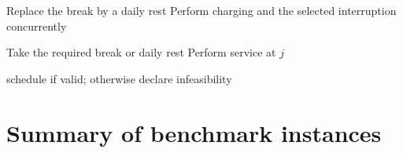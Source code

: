 \documentclass[3p,11pt,authoryear]{elsarticle}  %
\begin{document}
\begin{algorithm}[!htbp]
\begin{algorithmic}[1]
            \State Replace the break by a daily rest
        \EndIf
        \State Perform charging and the selected interruption concurrently

    \Else
            \State Take the required break or daily rest
        \EndIf
        \State Perform service at \(j\)
    \EndIf
\EndFor

\State \Return schedule if valid; otherwise declare infeasibility
\end{algorithmic}
\end{algorithm}



\newpage
\section{Summary of benchmark instances}\label{appendix:Test_Instance}

\end{document}
